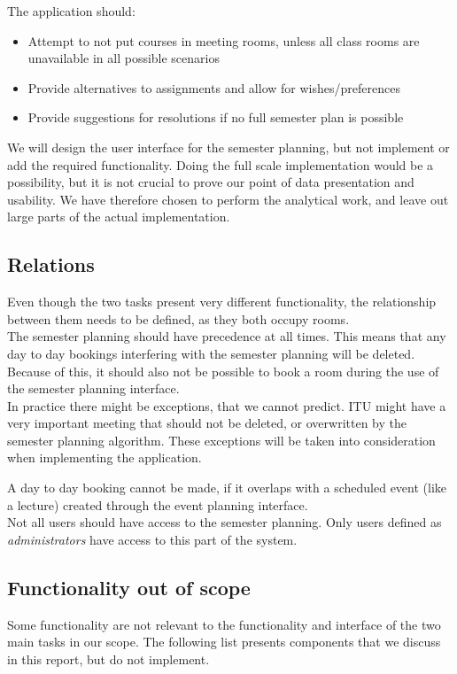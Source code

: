 The application should:

\begin{itemize}
	\item Attempt to not put courses in meeting rooms, unless all class rooms are unavailable in all possible scenarios
	\item Provide alternatives to assignments and allow for wishes/preferences
	\item Provide suggestions for resolutions if no full semester plan is possible
\end{itemize}


We will design the user interface for the semester planning, but not implement or add the required functionality. Doing the full scale implementation would be a possibility, but it is not crucial to prove our point of data presentation and usability. We have therefore chosen to perform the analytical work, and leave out large parts of the actual implementation.

\subsection{Relations}
Even though the two tasks present very different functionality, the relationship between them needs to be defined, as they both occupy rooms. \\

The semester planning should have precedence at all times. This means that any day to day bookings interfering with the semester planning will be deleted. Because of this, it should also not be possible to book a room during the use of the semester planning interface. \\

In practice there might be exceptions, that we cannot predict. ITU might have a very important meeting that should not be deleted, or overwritten by the semester planning algorithm. These exceptions will be taken into consideration when implementing the application.

A day to day booking cannot be made, if it overlaps with a scheduled event (like a lecture) created through the event planning interface.\\

Not all users should have access to the semester planning. Only users defined as \emph{administrators} have access to this part of the system.

\subsection{Functionality out of scope}
Some functionality are not relevant to the functionality and interface of the two main tasks in our scope. The following list presents components that we discuss in this report, but do not implement.

